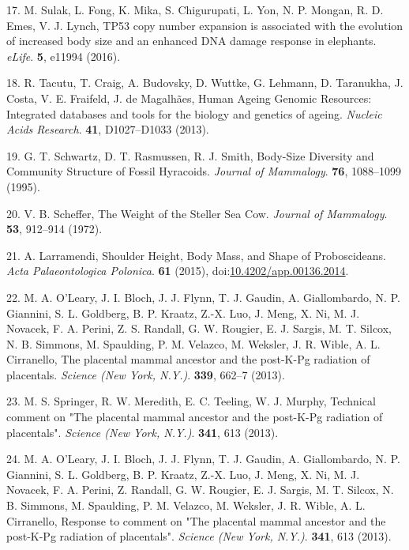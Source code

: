 \documentclass[]{elsarticle} %
\begin{document}
\leavevmode\hypertarget{ref-Sulak2015}{}%
17. M. Sulak, L. Fong, K. Mika, S. Chigurupati, L. Yon, N. P. Mongan, R. D. Emes, V. J. Lynch, TP53 copy number expansion is associated with the evolution of increased body size and an enhanced DNA damage response in elephants. \emph{eLife}. \textbf{5}, e11994 (2016).

\leavevmode\hypertarget{ref-HAGR}{}%
18. R. Tacutu, T. Craig, A. Budovsky, D. Wuttke, G. Lehmann, D. Taranukha, J. Costa, V. E. Fraifeld, J. de Magalhães, Human Ageing Genomic Resources: Integrated databases and tools for the biology and genetics of ageing. \emph{Nucleic Acids Research}. \textbf{41}, D1027--D1033 (2013).

\leavevmode\hypertarget{ref-Schwartz1995}{}%
19. G. T. Schwartz, D. T. Rasmussen, R. J. Smith, Body-Size Diversity and Community Structure of Fossil Hyracoids. \emph{Journal of Mammalogy}. \textbf{76}, 1088--1099 (1995).

\leavevmode\hypertarget{ref-Scheffer1972}{}%
20. V. B. Scheffer, The Weight of the Steller Sea Cow. \emph{Journal of Mammalogy}. \textbf{53}, 912--914 (1972).

\leavevmode\hypertarget{ref-Larramendi:20151c2}{}%
21. A. Larramendi, Shoulder Height, Body Mass, and Shape of Proboscideans. \emph{Acta Palaeontologica Polonica}. \textbf{61} (2015), doi:\href{https://doi.org/10.4202/app.00136.2014}{10.4202/app.00136.2014}.

\leavevmode\hypertarget{ref-OLeary2013a}{}%
22. M. A. O'Leary, J. I. Bloch, J. J. Flynn, T. J. Gaudin, A. Giallombardo, N. P. Giannini, S. L. Goldberg, B. P. Kraatz, Z.-X. Luo, J. Meng, X. Ni, M. J. Novacek, F. A. Perini, Z. S. Randall, G. W. Rougier, E. J. Sargis, M. T. Silcox, N. B. Simmons, M. Spaulding, P. M. Velazco, M. Weksler, J. R. Wible, A. L. Cirranello, The placental mammal ancestor and the post-K-Pg radiation of placentals. \emph{Science (New York, N.Y.)}. \textbf{339}, 662--7 (2013).

\leavevmode\hypertarget{ref-Springer2013}{}%
23. M. S. Springer, R. W. Meredith, E. C. Teeling, W. J. Murphy, Technical comment on "The placental mammal ancestor and the post-K-Pg radiation of placentals". \emph{Science (New York, N.Y.)}. \textbf{341}, 613 (2013).

\leavevmode\hypertarget{ref-OLeary2013b}{}%
24. M. A. O'Leary, J. I. Bloch, J. J. Flynn, T. J. Gaudin, A. Giallombardo, N. P. Giannini, S. L. Goldberg, B. P. Kraatz, Z.-X. Luo, J. Meng, X. Ni, M. J. Novacek, F. A. Perini, Z. Randall, G. W. Rougier, E. J. Sargis, M. T. Silcox, N. B. Simmons, M. Spaulding, P. M. Velazco, M. Weksler, J. R. Wible, A. L. Cirranello, Response to comment on "The placental mammal ancestor and the post-K-Pg radiation of placentals". \emph{Science (New York, N.Y.)}. \textbf{341}, 613 (2013).
\end{document}
